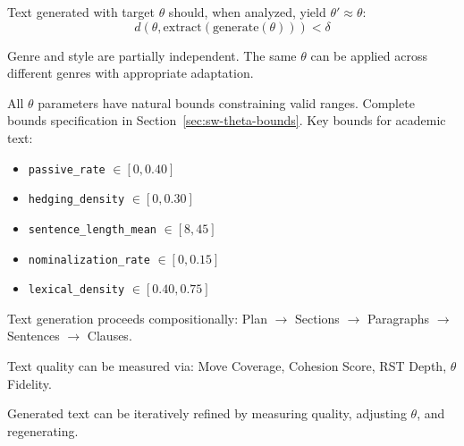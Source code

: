 \begin{axiom}
\label{ax:swsm-14}
Text generated with target $\theta$ should, when analyzed, yield $\theta' \approx \theta$:
\begin{equation}
d(\theta, \text{extract}(\text{generate}(\theta))) < \delta
\end{equation}
\end{axiom}

\begin{axiom}
\label{ax:swsm-15}
Genre and style are partially independent. The same $\theta$ can be applied across different genres with appropriate adaptation.
\end{axiom}

\begin{axiom}
\label{ax:swsm-16}
All $\theta$ parameters have natural bounds constraining valid ranges. Complete bounds specification in Section~\ref{sec:sw-theta-bounds}. Key bounds for academic text:
\begin{itemize}
    \item \texttt{passive\_rate} $\in [0, 0.40]$
    \item \texttt{hedging\_density} $\in [0, 0.30]$
    \item \texttt{sentence\_length\_mean} $\in [8, 45]$
    \item \texttt{nominalization\_rate} $\in [0, 0.15]$
    \item \texttt{lexical\_density} $\in [0.40, 0.75]$
\end{itemize}
\end{axiom}

\begin{axiom}
\label{ax:swsm-17}
Text generation proceeds compositionally: Plan $\rightarrow$ Sections $\rightarrow$ Paragraphs $\rightarrow$ Sentences $\rightarrow$ Clauses.
\end{axiom}

\begin{axiom}
\label{ax:swsm-18}
Text quality can be measured via: Move Coverage, Cohesion Score, RST Depth, $\theta$ Fidelity.
\end{axiom}

\begin{axiom}
\label{ax:swsm-19}
Generated text can be iteratively refined by measuring quality, adjusting $\theta$, and regenerating.
\end{axiom}

